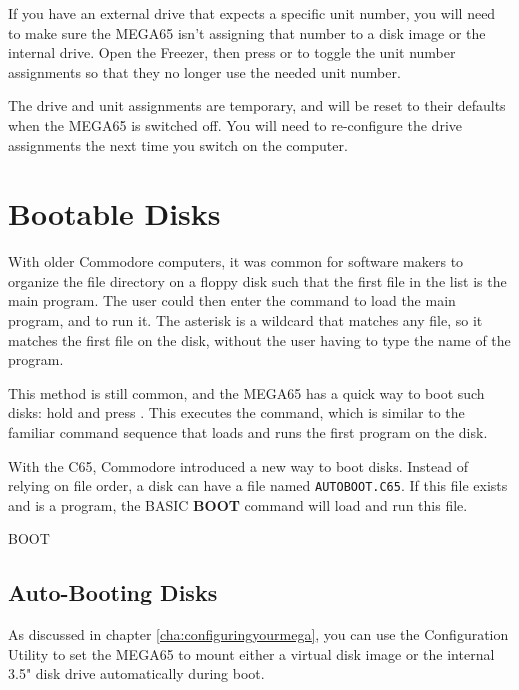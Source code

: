 If you have an external drive that expects a specific unit number, you will need to make sure the MEGA65 isn't assigning that number to a disk image or the internal drive. Open the Freezer, then press  or  to toggle the unit number assignments so that they no longer use the needed unit number.

The drive and unit assignments are temporary, and will be reset to their defaults when the MEGA65 is switched off. You will need to re-configure the drive assignments the next time you switch on the computer.


\section{Bootable Disks}

With older Commodore computers, it was common for software makers to organize the file directory on a floppy disk such that the first file in the list is the main program. The user could then enter the command  to load the main program, and  to run it. The asterisk is a wildcard that matches any file, so it matches the first file on the disk, without the user having to type the name of the program.

This method is still common, and the MEGA65 has a quick way to boot such disks: hold  and press . This executes the  command, which is similar to the familiar command sequence that loads and runs the first program on the disk.

With the C65, Commodore introduced a new way to boot disks. Instead of relying on file order, a disk can have a file named {\tt AUTOBOOT.C65}. If this file exists and is a program, the BASIC {\bf BOOT} command will load and run this file.

\begin{screencode}
BOOT
\end{screencode}

\subsection{Auto-Booting Disks}

As discussed in chapter \vref{cha:configuringyourmega}, you can use the Configuration Utility to set the MEGA65 to mount either a virtual disk image or the internal 3.5" disk drive automatically during boot.

